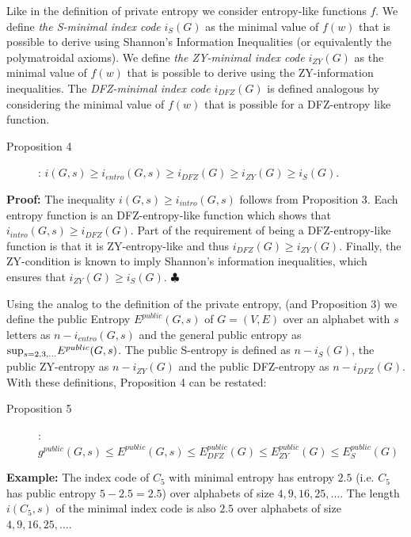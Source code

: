 \documentclass[12pt]{article}
\begin{document}
Like in the definition of private entropy we consider entropy-like functions $f$.
We define {\it the S-minimal index code} $i_S(G)$  as the minimal value of 
$f(w)$ that is possible to derive using Shannon's Information Inequalities 
(or equivalently the polymatroidal axioms). We define {\it the ZY-minimal  
index code} $i_{ZY}(G)$ as the minimal value of  $f(w)$ that is possible to 
derive using the ZY-information inequalities.  The {\it DFZ-minimal index code} 
$i_{DFZ}(G)$ is defined analogous by considering the minimal value of $f(w)$ 
that is possible for a DFZ-entropy like function.

\begin{description}

\item[Proposition 4]:  
$i(G,s) \geq i_{entro}(G,s) \geq i_{DFZ}(G) \geq i_{ZY}(G) \geq i_{S}(G)$.

\end{description}

\noindent
{\bf Proof:} The inequality $i(G,s) \geq i_{intro}(G,s)$ follows from Proposition 3.
Each entropy function is an DFZ-entropy-like function which shows that
$i_{intro}(G,s) \geq i_{DFZ}(G)$. Part of the requirement of being a DFZ-entropy-like function
is that it is ZY-entropy-like and thus $i_{DFZ}(G) \geq i_{ZY}(G)$. Finally, the ZY-condition
is known to imply Shannon's information inequalities, which ensures that $i_{ZY}(G) \geq i_{S}(G)$.
\hfill $\clubsuit$

Using the analog to the definition of the private entropy, (and Proposition 3) we define the public Entropy $E^{public}(G,s)$ of $G=(V,E)$ over an alphabet with $s$ letters as $n-i_{entro}(G,s)$ and the general public entropy as ${\rm sup}_{s=2,3,\ldots}E^{public}(G,s)$. The 
public S-entropy is defined as $n-i_{S}(G)$, the public ZY-entropy as $n-i_{ZY}(G)$ and the public DFZ-entropy as $n-i_{DFZ}(G)$. With these definitions, Proposition 4 can be restated:

\begin{description}

\item[Proposition 5]: {\it $g^{public}(G,s) \leq E^{public}(G,s) \leq E^{public}_{DFZ}(G) 
\leq E^{public}_{ZY}(G) \leq E^{public}_{S}(G)$} 

\end{description}

\noindent
{\bf Example:}  The index code of $C_5$ with minimal entropy has entropy $2.5$ (i.e. $C_5$ has public entropy $5-2.5=2.5$) over alphabets of size $4,9,16,25, \ldots$.  The length $i(C_5,s)$ of the minimal index code is also $2.5$ over alphabets of size $4,9,16,25, \ldots $. 
\end{document}
